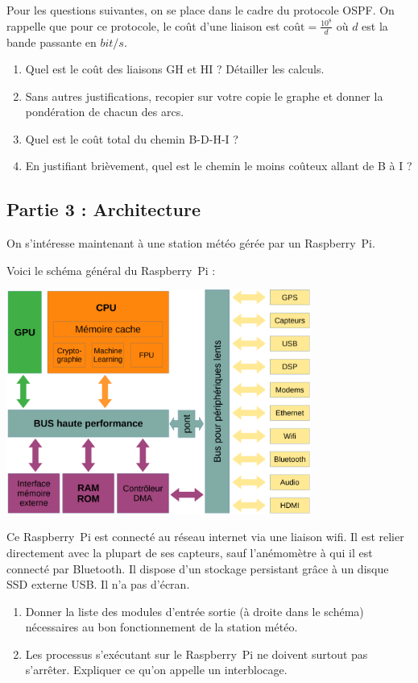 \documentclass[11pt,a4paper,french,twoside]{PMCours}
\begin{document}
Pour les questions suivantes, on se place dans le cadre du protocole OSPF.
On rappelle que pour ce protocole, le coût d'une liaison est 
$\text{coût}=\frac{10^8}{d}$ où $d$ est la bande passante en $bit/s$.
\begin{enumerate}
    \item Quel est le coût des liaisons GH et HI ? Détailler les calculs.
    \item Sans autres justifications, recopier sur votre copie le graphe et donner la pondération de chacun des arcs. 
    \item Quel est le coût total du chemin B-D-H-I ?
    \item En justifiant brièvement, quel est le chemin le moins coûteux allant de B à I ?
\end{enumerate}

\subsection*{Partie 3 : Architecture}
On s'intéresse maintenant à une station météo gérée par un Raspberry~Pi. 

Voici le schéma général du Raspberry~Pi :
\begin{center}
    \includegraphics[width=10cm]{SchemaSoc.png}
\end{center}

Ce Raspberry~Pi est connecté au réseau internet via une liaison wifi. Il est 
relier directement avec la plupart de ses capteurs, sauf l'anémomètre à qui il 
est connecté par Bluetooth. Il dispose d'un stockage persistant grâce à un
disque SSD externe USB. Il n'a pas d'écran.  

\begin{enumerate}
    \item Donner la liste des modules d'entrée sortie (à droite dans le schéma) 
    nécessaires au bon fonctionnement de la station météo.
    \item Les processus s'exécutant sur le Raspberry~Pi ne doivent surtout pas
    s'arrêter. Expliquer ce qu'on appelle un interblocage.
\end{enumerate}
\end{document}
